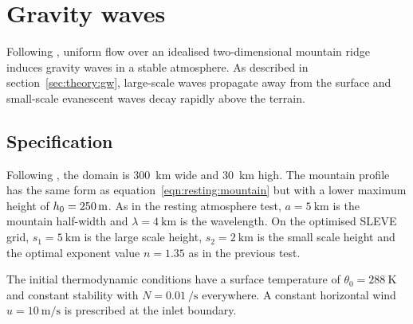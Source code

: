 \section{Gravity waves}
\label{sec:gw}

Following \textcite{schaer2002}, uniform flow over an idealised two-dimensional mountain ridge induces gravity waves in a stable atmosphere.  As described in section~\ref{sec:theory:gw}, large-scale waves propagate away from the surface and small-scale evanescent waves decay rapidly above the terrain.

\subsection{Specification}
Following \textcite{melvin2010}, the domain is \SI{300}{\kilo\meter} wide and \SI{30}{\kilo\meter} high.  The mountain profile has the same form as equation~\ref{eqn:resting:mountain} but with a lower maximum height of $h_0 = \SI{250}{\meter}$.  As in the resting atmosphere test, $a = \SI{5}{\kilo\meter}$ is the mountain half-width and $\lambda = \SI{4}{\kilo\meter}$ is the wavelength.  On the optimised SLEVE grid, $s_1 = \SI{5}{\kilo\meter}$ is the large scale height, $s_2 = \SI{2}{\kilo\meter}$ is the small scale height and the optimal exponent value $n = 1.35$ as in the previous test.

The initial thermodynamic conditions have a surface temperature of $\theta_0 = \SI{288}{\kelvin}$ and constant stability with $N = \SI{0.01}{\per\second}$ everywhere.  A constant horizontal wind $u = \SI{10}{\meter\per\second}$ is prescribed at the inlet boundary.

